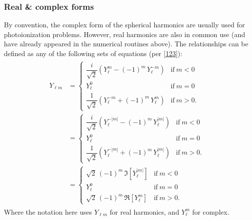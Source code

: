 \documentclass[letterpaper,table,10pt,english]{jupyterBook}
\begin{document}
\subsubsection{Real \& complex forms}
\label{\detokenize{part1/theory_observables_intro_100723:real-complex-forms}}
\sphinxAtStartPar
By convention, the complex form of the spherical harmonics are usually used for photoionization problems. However, real harmonics are also in common use (and have already appeared in the numerical routines above). The relationships can be defined as any of the following sets of equations (per  {[}\hyperlink{cite.backmatter/bibliography:id963}{123}{]}):
\begin{equation}\label{equation:part1/theory_observables_intro_100723:eq:re-complex-YLM}
\begin{split}
\begin{aligned}
Y_{\ell m}&={\begin{cases}{\dfrac {i}{\sqrt {2}}}\left(Y_{\ell }^{m}-(-1)^{m}\,Y_{\ell }^{-m}\right)&{\text{if}}\ m\lt0
\\Y_{\ell }^{0}&{\text{if}}\ m=0
\\{\dfrac {1}{\sqrt {2}}}\left(Y_{\ell }^{-m}+(-1)^{m}\,Y_{\ell }^{m}\right)&{\text{if}}\ m\gt0.\end{cases}}
\\&={\begin{cases}{\dfrac {i}{\sqrt {2}}}\left(Y_{\ell }^{-|m|}-(-1)^{m}\,Y_{\ell }^{|m|}\right)&{\text{if}}\ m\lt0
\\Y_{\ell }^{0}&{\text{if}}\ m=0
\\{\dfrac {1}{\sqrt {2}}}\left(Y_{\ell }^{-|m|}+(-1)^{m}\,Y_{\ell }^{|m|}\right)&{\text{if}}\ m\gt0.\end{cases}}
\\&={\begin{cases}{\sqrt {2}}\,(-1)^{m}\,\Im [{Y_{\ell }^{|m|}}]&{\text{if}}\ m\lt0
\\Y_{\ell }^{0}&{\text{if}}\ m=0
\\{\sqrt {2}}\,(-1)^{m}\,\Re [{Y_{\ell }^{m}}]&{\text{if}}\ m\gt0.\end{cases}}
\end{aligned}
\end{split}
\end{equation}
\sphinxAtStartPar
Where the notation here uses \(Y_{\ell m}\) for real harmonics, and \(Y_{\ell }^{m}\) for complex.
\end{document}
